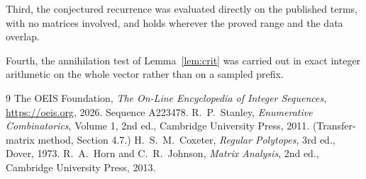 \documentclass[11pt,a4paper]{article}
\theoremstyle{plain}
\theoremstyle{definition}
\begin{document}
Third, the conjectured recurrence was evaluated directly on the published terms, with no
matrices involved, and holds wherever the proved range and the data overlap.

Fourth, the annihilation test of Lemma~\ref{lem:crit} was carried out in exact integer
arithmetic on the whole vector rather than on a sampled prefix.

\begin{thebibliography}{9}
 The OEIS Foundation, \emph{The On-Line Encyclopedia of Integer
Sequences}, \url{https://oeis.org}, 2026. Sequence A223478.
 R.~P.~Stanley, \emph{Enumerative Combinatorics}, Volume 1, 2nd ed.,
Cambridge University Press, 2011. (Transfer-matrix method, Section 4.7.)
 H.~S.~M.~Coxeter, \emph{Regular Polytopes}, 3rd ed., Dover, 1973.
 R.~A.~Horn and C.~R.~Johnson, \emph{Matrix Analysis}, 2nd ed., Cambridge
University Press, 2013.
\end{thebibliography}
\end{document}
